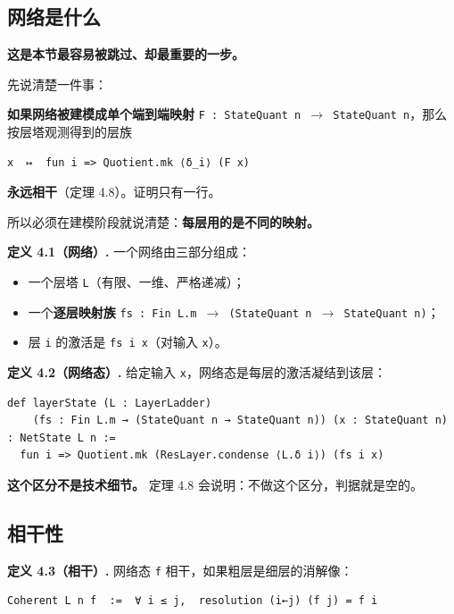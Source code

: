 \documentclass[11pt,a4paper]{ctexart}
\begin{document}
\subsection{网络是什么}

\textbf{这是本节最容易被跳过、却最重要的一步。}

先说清楚一件事：

\textbf{如果网络被建模成单个端到端映射} \texttt{F : StateQuant n \ensuremath{\to} StateQuant n}，那么按层塔观测得到的层族

\begin{lstlisting}
x  ↦  fun i => Quotient.mk ⟨δ_i⟩ (F x)
\end{lstlisting}

\textbf{永远相干}（定理 4.8）。证明只有一行。

所以必须在建模阶段就说清楚：\textbf{每层用的是不同的映射。}

\textbf{定义 4.1（网络）.} 一个网络由三部分组成：

\begin{itemize}
\item 一个层塔 \texttt{L}（有限、一维、严格递减）；
\item 一个\textbf{逐层映射族} \texttt{fs : Fin L.m \ensuremath{\to} (StateQuant n \ensuremath{\to} StateQuant n)}；
\item 层 \texttt{i} 的激活是 \texttt{fs i x}（对输入 \texttt{x}）。
\end{itemize}

\textbf{定义 4.2（网络态）.} 给定输入 \texttt{x}，网络态是每层的激活凝结到该层：

\begin{lstlisting}
def layerState (L : LayerLadder)
    (fs : Fin L.m → (StateQuant n → StateQuant n)) (x : StateQuant n) : NetState L n :=
  fun i => Quotient.mk (ResLayer.condense ⟨L.δ i⟩) (fs i x)
\end{lstlisting}

\textbf{这个区分不是技术细节。} 定理 4.8 会说明：不做这个区分，判据就是空的。

\subsection{相干性}

\textbf{定义 4.3（相干）.} 网络态 \texttt{f} 相干，如果粗层是细层的消解像：

\begin{lstlisting}
Coherent L n f  :=  ∀ i ≤ j,  resolution (i←j) (f j) = f i
\end{lstlisting}
\end{document}
